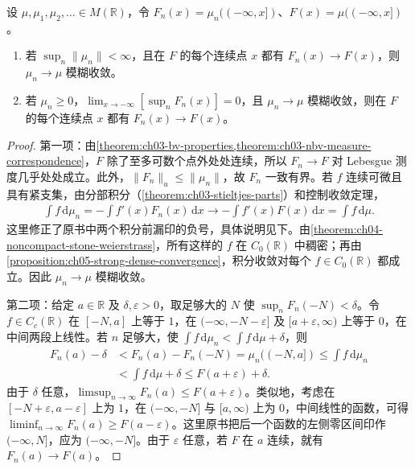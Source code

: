 \documentclass[../../main.tex]{subfiles}
\begin{document}
\begin{proposition}\label{proposition:ch07-vague-distribution}
设 $\mu,\mu_1,\mu_2,\ldots\in M(\mathbb R)$，令 $F_n(x)=\mu_n(({-\infty},x])$、$F(x)=\mu(({-\infty},x])$。
\begin{enumerate}
\item\label{item:ch07-distribution-implies-vague} 若 $\sup_n\|\mu_n\|<\infty$，且在 $F$ 的每个连续点 $x$ 都有 $F_n(x)\to F(x)$，则 $\mu_n\to\mu$ 模糊收敛。
\item\label{item:ch07-vague-implies-distribution} 若 $\mu_n\geqslant0$，$\lim_{x\to-\infty}[\sup_nF_n(x)]=0$，且 $\mu_n\to\mu$ 模糊收敛，则在 $F$ 的每个连续点 $x$ 都有 $F_n(x)\to F(x)$。
\end{enumerate}
\end{proposition}
\begin{proof}
第一项：由\cref{theorem:ch03-bv-properties,theorem:ch03-nbv-measure-correspondence}，$F$ 除了至多可数个点外处处连续，所以 $F_n\to F$ 对 Lebesgue 测度几乎处处成立。此外，$\|F_n\|_u\leqslant\|\mu_n\|$，故 $F_n$ 一致有界。若 $f$ 连续可微且具有紧支集，由分部积分（\cref{theorem:ch03-stieltjes-parts}）和控制收敛定理，
\begin{align*}
\int f\,\mathrm d\mu_n
=-\int f'(x)F_n(x)\,\mathrm dx
\longrightarrow-\int f'(x)F(x)\,\mathrm dx
=\int f\,\mathrm d\mu.
\end{align*}
这里修正了原书中两个积分前漏印的负号，具体说明见下。由\cref{theorem:ch04-noncompact-stone-weierstrass}，所有这样的 $f$ 在 $C_0(\mathbb R)$ 中稠密；再由\cref{proposition:ch05-strong-dense-convergence}，积分收敛对每个 $f\in C_0(\mathbb R)$ 都成立。因此 $\mu_n\to\mu$ 模糊收敛。

第二项：给定 $a\in\mathbb R$ 及 $\delta,\varepsilon>0$，取足够大的 $N$ 使 $\sup_nF_n(-N)<\delta$。令 $f\in C_c(\mathbb R)$ 在 $[-N,a]$ 上等于 $1$，在 $({-\infty},-N-\varepsilon]$ 及 $[a+\varepsilon,\infty)$ 上等于 $0$，在中间两段上线性。若 $n$ 足够大，使 $\int f\,\mathrm d\mu_n<\int f\,\mathrm d\mu+\delta$，则
\begin{align*}
F_n(a)-\delta&<F_n(a)-F_n(-N)=\mu_n((-N,a])\leqslant\int f\,\mathrm d\mu_n\\
&<\int f\,\mathrm d\mu+\delta\leqslant F(a+\varepsilon)+\delta.
\end{align*}
由于 $\delta$ 任意，$\limsup_{n\to\infty}F_n(a)\leqslant F(a+\varepsilon)$。类似地，考虑在 $[-N+\varepsilon,a-\varepsilon]$ 上为 $1$，在 $({-\infty},-N]$ 与 $[a,\infty)$ 上为 $0$，中间线性的函数，可得 $\liminf_{n\to\infty}F_n(a)\geqslant F(a-\varepsilon)$。这里原书把后一个函数的左侧零区间印作 $({-\infty},N]$，应为 $({-\infty},-N]$。由于 $\varepsilon$ 任意，若 $F$ 在 $a$ 连续，就有 $F_n(a)\to F(a)$。
\end{proof}
\end{document}
